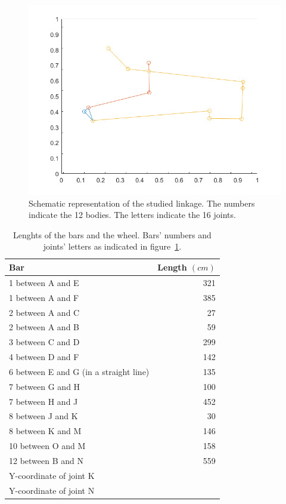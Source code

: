 \documentclass[a4paper]{article}
\begin{document}
\begin{figure}
	\includegraphics[width=\textwidth]{schematic.png}
	\centering
	\caption{Schematic representation of the studied linkage. The numbers indicate the 12 bodies. The letters indicate the 16 joints.}
	\label{fig:schematic}
\end{figure}

\begin{table}
	\centering
	\begin{tabular}{lr}
		\hline
		Bar & Length \((\si{cm})\) \\
		\hline
		1 between A and E & 321 \\
		1 between A and F & 385 \\
		2 between A and C & 27 \\
		2 between A and B & 59 \\
		3 between C and D & 299 \\
		4 between D and F & 142 \\
		6 between E and G (in a straight line) & 135 \\
		7 between G and H & 100 \\
		7 between H and J & 452 \\
		8 between J and K & 30 \\
		8 between K and M & 146 \\
		10 between O and M & 158 \\
		12 between B and N & 559 \\
		Y-coordinate of joint K \footnotemark & \\
		Y-coordinate of joint N \footnotemark & \\
		\hline
	\end{tabular}
	\caption{Lenghts of the bars and the wheel. Bars' numbers and joints' letters as indicated in figure~\ref{fig:schematic}.}
	\label{tab:lengths}
\end{table}
\end{document}
